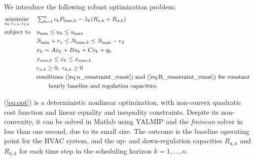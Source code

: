 We introduce the following robust optimization problem:
\begin{equation}\label{eq:opt}
\begin{aligned}
& \underset{u_k, r_{\text{u},k}, r_{\text{d},k}}{\text{minimize}} 
& & \textstyle\sum_{k=1}^{n} c_k P_{\text{base},k} - \lambda_k (R_{\text{u},k} + R_{\text{d},k}) \\
& \text{subject to}
& & u_{\text{min}} \leq u_{k} \leq u_{\text{max}} \\%
&&& N_{\text{min}} + r_u \leq N_{\text{base},k} \leq N_{\text{max}} - r_d \\
&&& x_k = Ax_k + Bu_k + Cv_k + q_k \\
&&& x_{\text{min},k} \leq x_{k} \leq x_{\text{max},k}  \\
&&& r_{\text{u},k} \geq 0, ~r_{\text{d},k} \geq 0\\
&&& \text{conditions~} (\ref{eq:u_constraint_const}) \text{~and~} (\ref{eq:R_constraint_const}) \text{~for constant }\\
&&& \quad\quad \text{hourly baseline and regulation capacities}.
\end{aligned}
\end{equation}

\noindent (\ref{eq:opt}) is a deterministic nonlinear optimization, with non-convex quadratic cost function and linear equality and inequality constraints. Despite its non-convexity, it can be solved in Matlab using YALMIP \cite{Lofberg:2004yalmip} and the \textit{fmincon} solver in less than one second, due to its small size. The outcome is the baseline operating point for the HVAC system, and the up- and down-regulation capacities $R_{\text{u},k}$ and $R_{\text{d},k}$ for each time step in the scheduling horizon $k = 1, \ldots, n$.


